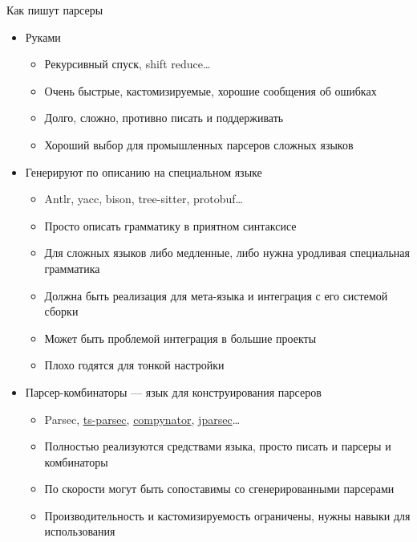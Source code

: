     \begin{frame}[fragile]{Как пишут парсеры \popslide}
        \vspace{-0.5em}
        \begin{itemize}
            \item Руками
            \begin{itemize}
                \item[\eg] Рекурсивный спуск, shift reduce\ldots
                \item[\positive] Очень быстрые, кастомизируемые, хорошие сообщения об ошибках
                \item[\negative] Долго, сложно, противно писать и поддерживать
                \item Хороший выбор для промышленных парсеров сложных языков
            \end{itemize}
            \item Генерируют по описанию на специальном языке
            \begin{itemize}
                \item[\eg] Antlr, yacc, bison, tree-sitter, protobuf\ldots
                \item[\positive] Просто описать грамматику в приятном синтаксисе
                \item[\negative] Для сложных языков либо медленные, либо нужна уродливая специальная грамматика
                \item[\negative] Должна быть реализация для мета-языка и интеграция с его системой сборки
                \item[\negative] Может быть проблемой интеграция в большие проекты
                \item[\negative] Плохо годятся для тонкой настройки
            \end{itemize}
            \item Парсер-комбинаторы --- язык для конструирования парсеров
            \begin{itemize}
                \item[\eg] Parsec, \href{https://github.com/microsoft/ts-parsec/tree/master}{\color{blue} ts-parsec}, \href{https://pypi.org/project/compynator/}{\color{blue} compynator}, \href{https://github.com/jparsec/jparsec}{\color{blue} jparsec}\ldots
                \item[\positive] Полностью реализуются средствами языка, просто писать и парсеры и комбинаторы
                \item[\positive] По скорости могут быть сопоставимы со сгенерированными парсерами
                \item[\negative] Производительность и кастомизируемость ограничены, нужны навыки для использования
            \end{itemize}
        \end{itemize}
    \end{frame}
    
